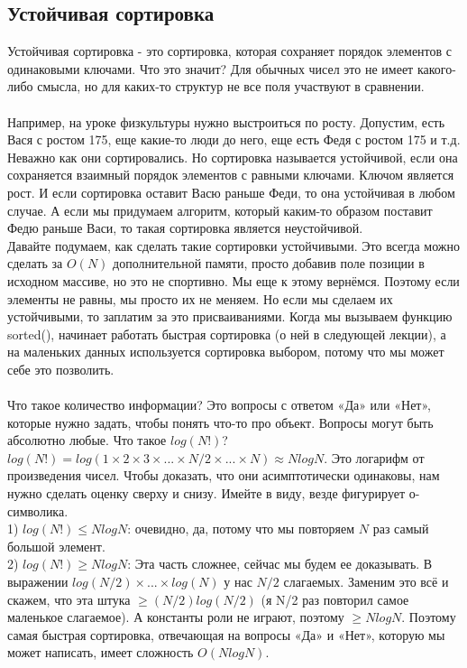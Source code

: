 \documentclass[a4paper,12pt]{article}
\begin{document}
\subsection{Устойчивая сортировка}
Устойчивая сортировка - это сортировка, которая сохраняет порядок элементов с одинаковыми ключами. Что это значит? Для обычных чисел это не имеет какого-либо смысла, но для каких-то структур не все поля участвуют в сравнении.\\
\\Например, на уроке физкультуры нужно выстроиться по росту. Допустим, есть Вася с ростом 175, еще какие-то люди до него, еще есть Федя с ростом 175 и т.д. Неважно как они сортировались. Но сортировка называется устойчивой, если она сохраняется взаимный порядок элементов с равными ключами. Ключом является рост. И если сортировка оставит Васю раньше Феди, то она устойчивая в любом случае. А если мы придумаем алгоритм, который каким-то образом поставит Федю раньше Васи, то такая сортировка является неустойчивой. \\
Давайте подумаем, как сделать такие сортировки устойчивыми. Это всегда можно сделать за $O(N)$ дополнительной памяти, просто добавив поле позиции в исходном массиве, но это не спортивно. Мы еще к этому вернёмся. Поэтому если элементы не равны, мы просто их не меняем. Но если мы сделаем их устойчивыми, то заплатим за это присваиваниями. Когда мы вызываем функцию sorted(), начинает работать быстрая сортировка (о ней в следующей лекции), а на маленьких данных используется сортировка выбором, потому что мы может себе это позволить. \\
\\
Что такое количество информации? Это вопросы с ответом «Да» или «Нет», которые нужно задать, чтобы понять что-то про объект. Вопросы могут быть абсолютно любые. 
Что такое $log(N!)$? $log(N!) = log(1 \times 2 \times 3 \times ... \times N/2 \times ... \times N) \approx NlogN$. Это логарифм от произведения чисел. Чтобы доказать, что они асимптотически одинаковы, нам нужно сделать оценку сверху и снизу. Имейте в виду, везде фигурирует о-символика.\\
1) $log(N!) \leq NlogN$: очевидно, да, потому что мы повторяем $N$ раз самый большой элемент.\\
2) $log(N!) \geq NlogN$: Эта часть сложнее, сейчас мы будем ее доказывать. В выражении $log(N/2) \times ... \times log(N)$ у нас $N/2$ слагаемых. Заменим это всё и скажем, что эта штука $\geq (N/2)log(N/2)$ (я N/2 раз повторил самое маленькое слагаемое). А константы роли не играют, поэтому $\geq NlogN$. Поэтому самая быстрая сортировка, отвечающая на вопросы «Да» и «Нет», которую мы может написать, имеет сложность $O(NlogN)$. \\
\end{document}
